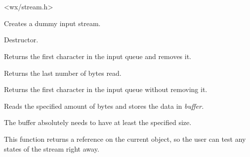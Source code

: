 \section{}\label{wxinputstream}




<wx/stream.h>



Creates a dummy input stream.



Destructor.



Returns the first character in the input queue and removes it.



Returns the last number of bytes read.



Returns the first character in the input queue without removing it.



Reads the specified amount of bytes and stores the data in \it{buffer}.


The buffer absolutely needs to have at least the specified size.


This function returns a reference on the current object, so the user can test
any states of the stream right away.


